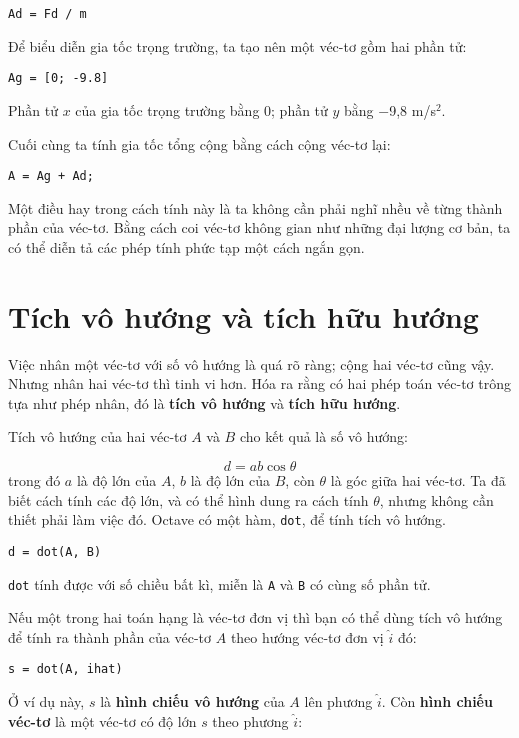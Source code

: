 \documentclass[12pt]{book}
\begin{document}
\begin{verbatim}
Ad = Fd / m
\end{verbatim}
%
Để biểu diễn gia tốc trọng trường, ta tạo nên một véc-tơ gồm hai 
phần tử:

\begin{verbatim}
Ag = [0; -9.8]
\end{verbatim}
%
Phần tử  $x$ của gia tốc trọng trường bằng 0; phần tử $y$ bằng 
$-$9,8 m/s${}^2$.

Cuối cùng ta tính gia tốc tổng cộng bằng cách cộng véc-tơ lại:

\begin{verbatim}
A = Ag + Ad;
\end{verbatim}
%
Một điều hay trong cách tính này là ta không cần phải nghĩ nhều về từng 
thành phần của véc-tơ. Bằng cách coi véc-tơ không gian như những đại lượng 
cơ bản, ta có thể diễn tả các phép tính phức tạp một cách ngắn gọn.


\section{Tích vô hướng và tích hữu hướng}

Việc nhân một véc-tơ với số vô hướng là quá rõ ràng; cộng hai véc-tơ cũng vậy. 
Nhưng nhân hai véc-tơ thì tinh vi hơn. Hóa ra rằng có hai phép toán véc-tơ 
trông tựa như phép nhân, đó là {\bf tích vô hướng} và {\bf tích hữu hướng}.

Tích vô hướng của hai véc-tơ $A$ và $B$ cho kết quả là số vô hướng:

\[ d = a b \cos \theta \]
%
trong đó $a$ là độ lớn của $A$, $b$ là độ lớn của $B$, còn 
$\theta$ là góc giữa hai véc-tơ. Ta đã biết cách tính các độ lớn, và có thể 
hình dung ra cách tính $\theta$, nhưng không cần thiết phải làm việc đó.  
Octave có một hàm, {\tt dot}, để tính tích vô hướng.

\begin{verbatim}
d = dot(A, B)
\end{verbatim}
%
{\tt dot} tính được với số chiều bất kì, miễn là {\tt A} và {\tt B} có cùng 
số phần tử.

Nếu một trong hai toán hạng là véc-tơ đơn vị thì bạn có thể dùng tích 
vô hướng để tính ra thành phần của véc-tơ $A$ theo hướng véc-tơ đơn vị 
$\hat{i}$ đó:

\begin{verbatim}
s = dot(A, ihat)
\end{verbatim}
%
Ở ví dụ này, $s$ là {\bf hình chiếu vô hướng} của $A$
lên phương $\hat{i}$. Còn {\bf hình chiếu véc-tơ} là một véc-tơ 
có độ lớn $s$ theo phương $\hat{i}$:
\end{document}
